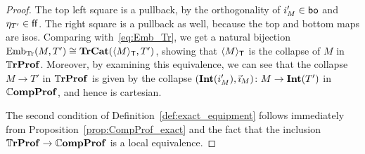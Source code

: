 \documentclass[12pt,oneside,article,draft]{memoir}
\begin{document}
\begin{proof}
   The top left square is a pullback, by the orthogonality of $i'_M\in\mathsf{bo}$ and $\eta_{T'}\in\mathsf{ff}$.
   The right square is a pullback as well, because the top and bottom maps are isos. Comparing with~\eqref{eq:Emb_Tr}, we get a natural bijection
   $\mathrm{Emb}_{\mathrm{Tr}}(M,T')\cong\mathbf{TrCat}(\langle M\rangle_{\mathsf{T}},T')$, showing that $\langle M\rangle_{\mathsf{T}}$ is the collapse of
   $M$ in $\mathbb{T}\mathbf{rProf}$. Moreover, by examining this equivalence, we can see that the collapse $M\to
   T'$ in $\mathbb{T}\mathbf{rProf}$ is given by the collapse $(\mathbf{Int}(i'_M),\vec{\imath}_M)\colon M\to\mathbf{Int}(T')$ in
   $\mathbb{C}\mathbf{ompProf}$, and hence is cartesian.

   The second condition of Definition~\ref{def:exact_equipment} follows immediately from Proposition~\ref{prop:CompProf_exact} and the fact that the inclusion $\mathbb{T}\mathbf{rProf}\to\mathbb{C}\mathbf{ompProf}$ is a local equivalence.
\end{proof}
\end{document}
